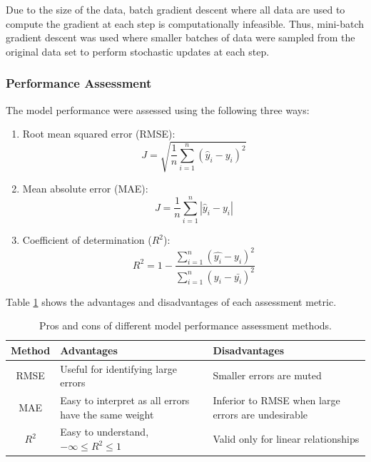 Due to the size of the data, batch gradient descent where all data are used to compute the gradient at each step is computationally infeasible.  Thus, mini-batch gradient descent was used where smaller batches of data were sampled from the original data set to perform stochastic updates at each step.
\subsubsection{Performance Assessment}
The model performance were assessed using the following three ways:
\begin{enumerate}
    \item Root mean squared error (RMSE):
    \begin{equation}
        J = \sqrt{\frac{1}{n}\sum\limits^n_{i=1}(\hat{y}_i - y_i)^2}
        \label{eq:08RMSE}
    \end{equation}
    
    \item Mean absolute error (MAE):
    \begin{equation}
        J = \frac{1}{n}\sum\limits^n_{i=1}|\hat{y}_i - y_i|
        \label{eq:08MSE_Error}
    \end{equation}
    \item Coefficient of determination ($R^2$):
    \begin{equation}
        R^2 = 1 - \frac{\sum\limits^n_{i = 1}(\hat{y_i} - y_i)^2}{\sum\limits^n_{i = 1}(y_i - \bar{y_i})^2}
    \end{equation}
\end{enumerate}
Table \ref{tab:08performanceassessment} shows the advantages and disadvantages of each assessment metric.
\begin{table}[h]
    \centering
    {
    \begin{tabular}{ c | p{7cm} | p{7cm}}
         Method             & Advantages        &  Disadvantages \\
        \hline
        RMSE                &  Useful for identifying large errors                            &  Smaller errors are muted        \\
        
        MAE                 &  Easy to interpret as all errors have the same weight           &  Inferior to RMSE when large errors are undesirable \\
        
        $R^2$               &  Easy to understand, $-\infty \leq R^2 \leq 1$                                         &  Valid only for linear relationships       \\             
    \end{tabular}}
    \caption{Pros and cons of different model performance assessment methods.}
    \label{tab:08performanceassessment}
\end{table}

